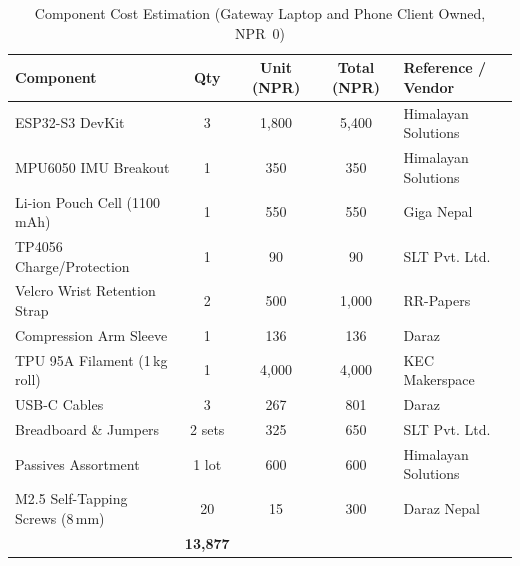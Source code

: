 \begin{table}[ht!]
    \centering
    \renewcommand{\arraystretch}{1.3}
    \begin{tabular}{|>{\raggedright\arraybackslash}p{3.8cm}|c|c|c|>{\raggedright\arraybackslash}p{2.8cm}|}
        \hline
        \textbf{Component}                  & \textbf{Qty}      & \textbf{Unit (NPR)} & \textbf{Total (NPR)} & \textbf{Reference / Vendor} \\
        \hline
        ESP32-S3 DevKit                     & 3                 & 1{,}800             & 5{,}400              & Himalayan Solutions         \\
        \hline
        MPU6050 IMU Breakout                & 1                 & 350                 & 350                  & Himalayan Solutions         \\
        \hline
        Li-ion Pouch Cell (1100\,mAh)       & 1                 & 550                 & 550                  & Giga Nepal                  \\
        \hline
        TP4056 Charge/Protection            & 1                 & 90                  & 90                   & SLT Pvt. Ltd.               \\
        \hline
        Velcro Wrist Retention Strap        & 2                 & 500                 & 1{,}000              & RR-Papers                   \\
        \hline
        Compression Arm Sleeve              & 1                 & 136                 & 136                  & Daraz                       \\
        \hline
        TPU 95A Filament (1\,kg roll)       & 1                 & 4{,}000             & 4{,}000              & KEC Makerspace              \\
        \hline
        USB-C Cables                        & 3                 & 267                 & 801                  & Daraz                       \\
        \hline
        Breadboard \& Jumpers               & 2 sets            & 325                 & 650                  & SLT Pvt. Ltd.               \\
        \hline
        Passives Assortment                 & 1 lot             & 600                 & 600                  & Himalayan Solutions         \\
        \hline
        M2.5 Self-Tapping Screws (8\,mm)    & 20                & 15                  & 300                  & Daraz Nepal                 \\
        \hline
        \rowcolor{gray!30}
        \multicolumn{3}{r|}{\textbf{Total}} & \textbf{13{,}877} &                                                                          \\
        \hline
    \end{tabular}
    \caption{Component Cost Estimation (Gateway Laptop and Phone Client Owned, NPR~0)}
    \label{tab:component_cost}
\end{table}

\vspace{0.5em}